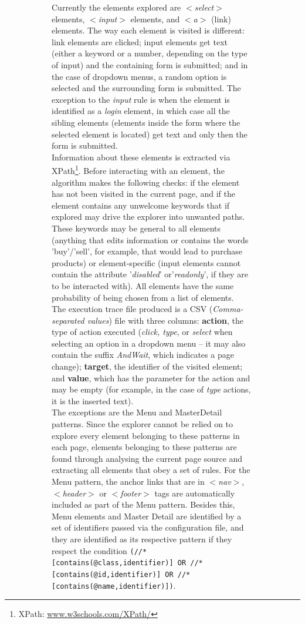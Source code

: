 \documentclass[conference]{IEEEtran}
\begin{document}
\begin{enumerate}
\begin{figure}[!htb]
\begin{itemize}
\begin{figure}[!htb]
\begin{itemize}
Currently the elements explored are \textit{$<$select$>$} elements, \textit{$<$input$>$} elements, and \textit{$<$a$>$} (link) elements. The way each element is visited is different: link elements are clicked; input elements get text (either a keyword or a number, depending on the type of input) and the containing form is submitted; and in the case of dropdown menus, a random option is selected and the surrounding form is submitted. The exception to the \textit{input} rule is when the element is identified as a \textit{login} element, in which case all the sibling elements (elements inside the form where the selected element is located) get text and only then the form is submitted.\\

Information about these elements is extracted via XPath\footnote{XPath: \url{www.w3schools.com/XPath/}}. Before interacting with an element, the algorithm makes the following checks: if the element has not been visited in the current page, and if the element contains any unwelcome keywords that if explored may drive the explorer into unwanted paths. These keywords may be general to all elements (anything that edits information or contains the words 'buy'/'sell', for example, that would lead to purchase products) or element-specific (input elements cannot contain the attribute '\textit{disabled}' or'\textit{readonly}', if they are to be interacted with). All elements have the same probability of being chosen from a list of elements.\\

The execution trace file produced is a CSV (\textit{Comma-separated values}) file with three columns: \textbf{action}, the type of action executed (\textit{click, type}, or \textit{select} when selecting an option in a dropdown menu -- it may also contain the suffix \textit{AndWait}, which indicates a page change); \textbf{target}, the identifier of the visited element; and \textbf{value}, which has the parameter for the action and may be empty (for example, in the case of \textit{type} actions, it is the inserted text).\\

The exceptions are the Menu and MasterDetail patterns. Since the explorer cannot be relied on to explore every element belonging to these patterns in each page, elements belonging to these patterns are found through analysing the current page source and extracting all elements that obey a set of rules. For the Menu pattern, the anchor links that are in \textit{$<$nav$>$}, \textit{$<$header$>$} or \textit{$<$footer$>$} tags are automatically included as part of the Menu pattern. Besides this, Menu elements and Master Detail are identified by a set of identifiers passed via the configuration file, and they are identified as its respective pattern if they respect the condition \texttt{(//*[contains(@class,identifier)] OR //*[contains(@id,identifier)] OR //*[contains(@name,identifier)])}.\\


\end{itemize}
\end{figure}
\end{itemize}
\end{figure}
\end{enumerate}
\end{document}
